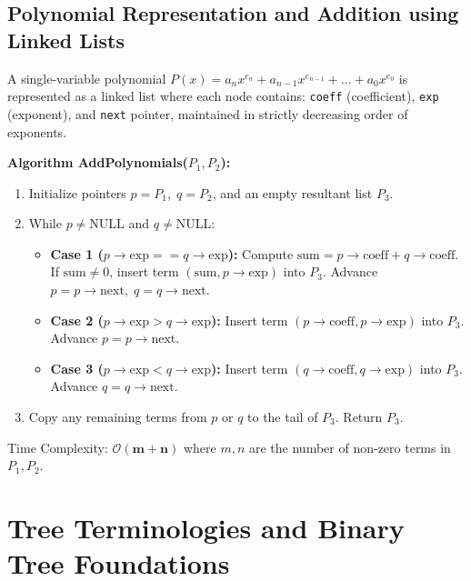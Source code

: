 \documentclass[12pt,a4paper]{article}
\begin{document}
\subsection{Polynomial Representation and Addition using Linked Lists}
A single-variable polynomial $P(x) = a_n x^{e_n} + a_{n-1} x^{e_{n-1}} + \dots + a_0 x^{e_0}$ is represented as a linked list where each node contains: \texttt{coeff} (coefficient), \texttt{exp} (exponent), and \texttt{next} pointer, maintained in strictly decreasing order of exponents.

\begin{tcolorbox}[defbox, title={\textbf{Algorithm: Polynomial Addition using Singly Linked Lists}}]
\textbf{Algorithm AddPolynomials($P_1, P_2$):}
\begin{enumerate}[leftmargin=*, nosep]
  \item Initialize pointers $p = P_1, \; q = P_2$, and an empty resultant list $P_3$.
  \item While $p \ne \text{NULL}$ and $q \ne \text{NULL}$:
  \begin{itemize}[leftmargin=*, nosep]
    \item \textbf{Case 1 ($p\to\text{exp} == q\to\text{exp}$):} Compute $\text{sum} = p\to\text{coeff} + q\to\text{coeff}$. If $\text{sum} \ne 0$, insert term $(\text{sum}, p\to\text{exp})$ into $P_3$. Advance $p = p\to\text{next}, \; q = q\to\text{next}$.
    \item \textbf{Case 2 ($p\to\text{exp} > q\to\text{exp}$):} Insert term $(p\to\text{coeff}, p\to\text{exp})$ into $P_3$. Advance $p = p\to\text{next}$.
    \item \textbf{Case 3 ($p\to\text{exp} < q\to\text{exp}$):} Insert term $(q\to\text{coeff}, q\to\text{exp})$ into $P_3$. Advance $q = q\to\text{next}$.
  \end{itemize}
  \item Copy any remaining terms from $p$ or $q$ to the tail of $P_3$. Return $P_3$.
\end{enumerate}
Time Complexity: $\mathbf{\mathcal{O}(m + n)}$ where $m, n$ are the number of non-zero terms in $P_1, P_2$.
\end{tcolorbox}

\section{Tree Terminologies and Binary Tree Foundations}
\end{document}
